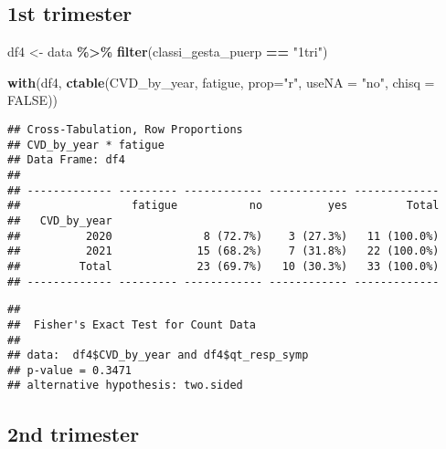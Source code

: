 \documentclass[
]{article}
\newenvironment{Shaded}{\begin{snugshade}}{\end{snugshade}}
\newcommand{\AttributeTok}[1]{\textcolor[rgb]{0.13,0.29,0.53}{#1}}
\newcommand{\ConstantTok}[1]{\textcolor[rgb]{0.56,0.35,0.01}{#1}}
\newcommand{\FunctionTok}[1]{\textcolor[rgb]{0.13,0.29,0.53}{\textbf{#1}}}
\newcommand{\NormalTok}[1]{#1}
\newcommand{\OtherTok}[1]{\textcolor[rgb]{0.56,0.35,0.01}{#1}}
\newcommand{\SpecialCharTok}[1]{\textcolor[rgb]{0.81,0.36,0.00}{\textbf{#1}}}
\newcommand{\StringTok}[1]{\textcolor[rgb]{0.31,0.60,0.02}{#1}}
\begin{document}
\hypertarget{st-trimester-3}{%
\subsection{1st trimester}\label{st-trimester-3}}

\begin{Shaded}
\begin{Highlighting}[]
\NormalTok{df4 }\OtherTok{\textless{}{-}}\NormalTok{ data }\SpecialCharTok{\%\textgreater{}\%} 
  \FunctionTok{filter}\NormalTok{(classi\_gesta\_puerp }\SpecialCharTok{==} \StringTok{"1tri"}\NormalTok{)}

\FunctionTok{with}\NormalTok{(df4, }\FunctionTok{ctable}\NormalTok{(CVD\_by\_year, fatigue, }\AttributeTok{prop=}\StringTok{"r"}\NormalTok{, }\AttributeTok{useNA =} \StringTok{"no"}\NormalTok{, }\AttributeTok{chisq =} \ConstantTok{FALSE}\NormalTok{))}
\end{Highlighting}
\end{Shaded}

\begin{verbatim}
## Cross-Tabulation, Row Proportions  
## CVD_by_year * fatigue  
## Data Frame: df4  
## 
## ------------- --------- ------------ ------------ -------------
##                 fatigue           no          yes         Total
##   CVD_by_year                                                  
##          2020              8 (72.7%)    3 (27.3%)   11 (100.0%)
##          2021             15 (68.2%)    7 (31.8%)   22 (100.0%)
##         Total             23 (69.7%)   10 (30.3%)   33 (100.0%)
## ------------- --------- ------------ ------------ -------------
\end{verbatim}

\begin{Shaded}
\end{Shaded}

\begin{verbatim}
## 
##  Fisher's Exact Test for Count Data
## 
## data:  df4$CVD_by_year and df4$qt_resp_symp
## p-value = 0.3471
## alternative hypothesis: two.sided
\end{verbatim}

\hypertarget{nd-trimester-3}{%
\subsection{2nd trimester}\label{nd-trimester-3}}
\end{document}
